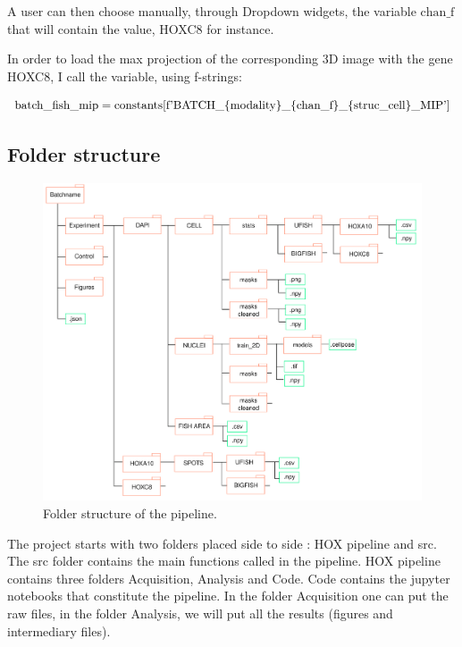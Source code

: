 \documentclass[24pt]{article}
\begin{document}
A user can then choose manually, through  Dropdown widgets, the variable $ \text{chan\_f}$ that will contain the value, HOXC8 for instance. 

In order to load the max projection of the corresponding 3D image with the gene HOXC8, I call the variable, using f-strings:


$$ \text{batch\_fish\_mip} = \text{constants[f'BATCH\_\{\text{modality}\}\_\{\text{chan\_f}\}\_\{\text{struc\_cell}\}\_MIP']} $$
 

 
 
%
\newpage

\subsection{Folder structure}

 \begin{figure}[h!] %
  \centering
  \includegraphics[width=1\textwidth]{Folder_struct.png} %
  \caption{Folder structure of the pipeline.}
  \label{fig:my_image} %
\end{figure}
 
  \newpage


       The project starts with two folders placed side to side : HOX pipeline and src. The src folder contains the main functions called in the pipeline. HOX pipeline contains three folders Acquisition, Analysis and Code. Code contains the jupyter notebooks that constitute the pipeline. In the folder Acquisition one can put the raw files, in the folder Analysis, we will put all the results (figures and intermediary files).
\end{document}
